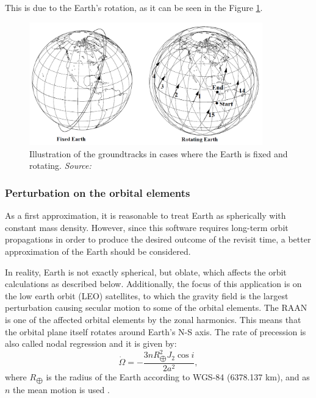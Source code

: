 This is due to the Earth's rotation, as it can be seen in the Figure \ref{groundtrack-fixed-rotating}.


\begin{figure}
\centering
\includegraphics[width=0.9\textwidth]{Images/groundtrack-fixed-rotating.png}\caption{Illustration of the groundtracks in cases where the Earth is fixed and rotating. \textit{Source: \cite{Vallado}}}
\label{groundtrack-fixed-rotating} 
\end{figure}


\bigskip
\subsubsection{Perturbation on the orbital elements}
\bigskip

As a first approximation, it is reasonable to treat Earth as spherically with constant mass density. However, since this software requires long-term orbit propagations in order to produce the desired outcome of the revisit time, a better approximation of the Earth should be considered.

In reality, Earth is not exactly spherical, but oblate, which affects the orbit calculations as described below. 
Additionally, the focus of this application is on the low earth orbit (LEO) satellites, to which the gravity field is the largest perturbation causing secular motion to some of the orbital elements. The RAAN is one of the affected orbital elements by the zonal harmonics. This means that the orbital plane itself rotates around Earth's N-S axis. The rate of precession is also called nodal regression and it is given by:
\begin{equation}
\dot{\Omega} = - \frac{3 n R_{\bigoplus}^{2} J_{2} \cos{i}}{2 a^{2}},
\end{equation}
where $R_{\bigoplus}$ is the radius of the Earth according to WGS-84 (6378.137 km), and as $n$ the mean motion is used \cite{Montenbruck}.


